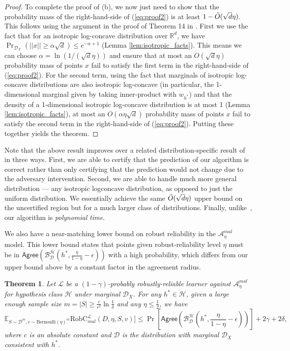 \documentclass[11pt]{article}
\newtheorem{theorem}{Theorem}[section]
\newcommand{\R}{\mathbb{R}}
\newcommand{\0}{\mathbf{0}}
\newcommand{\1}{\mathbf{1}}
\newcommand{\cA}{\mathcal{A}}
\newcommand{\cB}{\mathcal{B}}
\newcommand{\cD}{\mathcal{D}}
\newcommand{\cH}{\mathcal{H}}
\newcommand{\cL}{\mathcal{L}}
\newcommand{\cX}{\mathcal{X}}
\newcommand{\bbE}{\mathbb{E}}
\newcommand{\Agree}{\mathsf{Agree}}
\begin{document}
\begin{proof}
To complete the proof of (b), we now just need to show that the probability mass of the right-hand-side of (\ref{eq:proof2}) is at least $1-\Tilde{O}(\sqrt{d}\eta)$. This follows using the argument in the proof of Theorem 14 in \cite{balcan2013active}.
First we use the fact that for an isotropic log-concave distribution over $\R^d$, we have $\Pr_{\cD_\cX}(||x|| \geq \alpha \sqrt{d}) \leq e^{-\alpha+1}$ (Lemma \ref{lem:isotropic_facts}). This means we can choose $\alpha = \ln(1/(\sqrt{d}\eta))$ and ensure that at most an $O(\sqrt{d}\eta)$ probability mass of points $x$ fail to satisfy the first term in the right-hand-side of (\ref{eq:proof2}). For the second term, using the fact that marginals of isotropic log-concave distributions are also isotropic log-concave (in particular, the 1-dimensional marginal given by taking inner-product with $w_{h^*}$) and that the density of a 1-dimensional isotropic log-concave distribution is at most 1 (Lemma \ref{lem:isotropic_facts}), at most an $O(\alpha\eta\sqrt{d})$ probability mass of points $x$ fail to satisfy the second term in the right-hand-side of (\ref{eq:proof2}).  Putting these together yields the theorem.
\end{proof}

 Note that the above result improves over a related distribution-specific result of \cite{gao2021learning} in three ways. First, we are able to certify that the prediction of our algorithm is  correct rather than only certifying that  the prediction would not change due to the adversary intervention. Second, we are able  to handle much more general distribution --- any isotropic logconcave distribution, as opposed to just the uniform distribution. We essentially achieve the same $\Tilde{O}(\sqrt{d}\eta)$ upper bound on the uncertified region but for a much larger class of distributions. Finally, unlike~\cite{gao2021learning}, our algorithm is  {\em polynomial time}.

\smallskip

 We also have a near-matching lower bound on robust reliability in the $\cA^{mal}_\eta$ model. This lower bound states that points given robust-reliability level $\eta$ must be in $\Agree(\cB_\cD^\cH(h^*,\frac{\eta}{1-\eta}-\epsilon))$ with a high probability, which differs from our upper bound above by a constant factor in the agreement radius.


\begin{theorem}
Let $\cL$ be a $(1-\gamma)$-probably robustly-reliable learner against $\cA^{mal}_\eta$ for hypothesis class $\cH$ under marginal $\cD_X$. For any $h^*\in\cH$, given a large enough sample size $m=|S|\ge\frac{c}{\epsilon^2}\ln\frac{1}{\delta}$ and any $\eta\le\frac{1}{2}$, we have
$$\bbE_{S\sim\cD^m,v \sim \mbox{Bernoulli}(\eta)^m}\text{RobC}^\cL_{mal}(D,\eta,S,v)]\le \Pr\left[\Agree\left(\cB_\cD^\cH\left(h^*,\frac{\eta}{1-\eta}-\epsilon\right)\right)\right]+2\gamma+2\delta,$$
where $c$ is an absolute constant and $\cD$ is the distribution with marginal $\cD_X$ consistent with $h^*$.
\label{thm:probably_robustly-reliable_lower_bound_distributional_mal}
\end{theorem}
\end{document}
